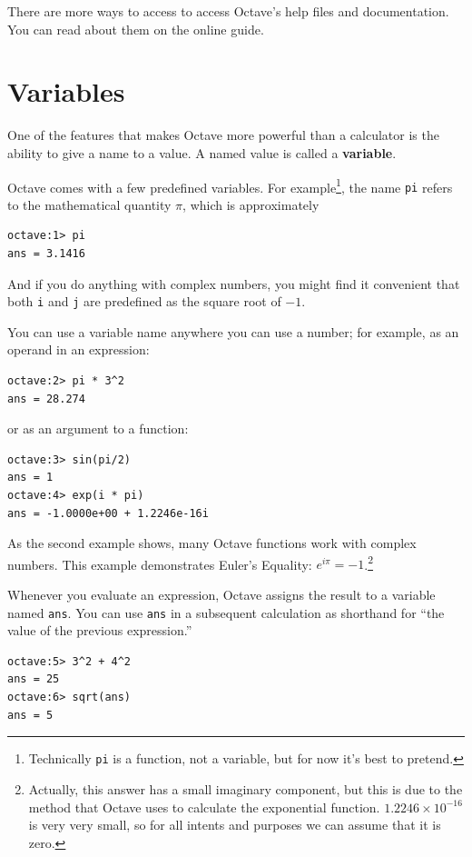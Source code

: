 \documentclass{book}
\begin{document}
There are more ways to access to access Octave's help files and documentation.
You can read about them on the online guide.


\section{Variables}

One of the features that makes Octave more powerful than a calculator
is the ability to give a name to a value. A named value is called
a {\bf variable}.

Octave comes with a few predefined variables. For
example\footnote{Technically {\tt pi} is a function, not a variable,
but for now it's best to pretend.}, the name {\tt pi} refers to the
mathematical quantity $\pi$, which is approximately

\begin{verbatim}
octave:1> pi
ans = 3.1416
\end{verbatim}

And if you do anything with complex numbers, you might find it
convenient that both {\tt i} and {\tt j} are predefined as the square
root of $-1$.

You can use a variable name anywhere you can use a number; for example, as
an operand in an expression:

\begin{verbatim}
octave:2> pi * 3^2
ans = 28.274
\end{verbatim}

or as an argument to a function:

\begin{verbatim}
octave:3> sin(pi/2)
ans = 1
octave:4> exp(i * pi)
ans = -1.0000e+00 + 1.2246e-16i
\end{verbatim}

As the second example shows, many Octave functions work with
complex numbers. This example demonstrates Euler's Equality:
$e^{i \pi} = -1$.\footnote{Actually, this answer has a small imaginary
component, but this is due to the method that Octave uses to calculate the
exponential function. $1.2246 \times 10^{-16}$ is very very small, so for all
intents and purposes we can assume that it is zero.}

Whenever you evaluate an expression, Octave assigns the result to
a variable named {\tt ans}. You can use {\tt ans} in a subsequent
calculation as shorthand for ``the value of the previous expression.''

\begin{verbatim}
octave:5> 3^2 + 4^2
ans = 25
octave:6> sqrt(ans)
ans = 5
\end{verbatim}
\end{document}
